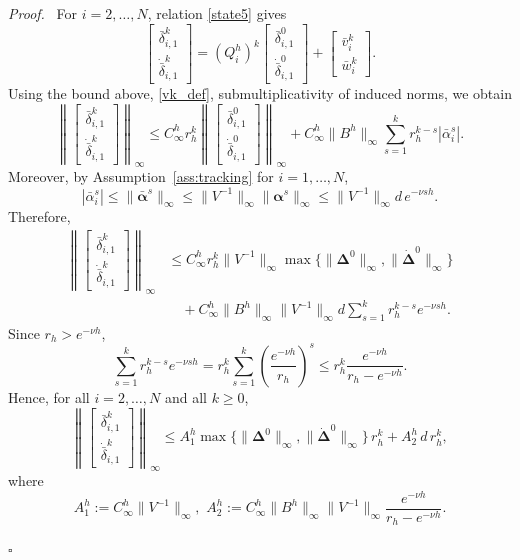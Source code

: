 \documentclass[letterpaper,journal]{IEEEtran}
\newenvironment{proof}{\par\noindent\textit{Proof.}\ }{\hfill$\square$\par}
\begin{document}
\begin{proof}
For \(i=2,\dots,N\), relation \eqref{state5} gives
\[
\begin{bmatrix}
\bar{\delta}_{i,1}^k \\[5pt]
\dot{\bar{\delta}}_{i,1}^k
\end{bmatrix}
=
(Q_i^h)^k
\begin{bmatrix}
\bar{\delta}_{i,1}^{0} \\[5pt]
\dot{\bar{\delta}}_{i,1}^{0}
\end{bmatrix}
+
\begin{bmatrix}
\bar{v}_i^k \\[5pt]
\bar{w}_i^k
\end{bmatrix}.
\]
Using the bound above, \eqref{vk_def}, submultiplicativity of induced norms, we obtain
\[
\left\|
\begin{bmatrix}
\bar{\delta}_{i,1}^k \\[5pt]
\dot{\bar{\delta}}_{i,1}^k
\end{bmatrix}
\right\|_\infty
\le
C_\infty^h r_h^k
\left\|
\begin{bmatrix}
\bar{\delta}_{i,1}^{0} \\[5pt]
\dot{\bar{\delta}}_{i,1}^{0}
\end{bmatrix}
\right\|_\infty
+
C_\infty^h\|B^h\|_\infty
\sum_{s=1}^{k}
r_h^{k-s}|\bar{\alpha}_i^s|.
\]
Moreover, by  Assumption~\ref{ass:tracking} for \(i=1,\dots,N\),
\[
|\bar{\alpha}_i^s|
\le \|\bar{\bm{\alpha}}^s\|_\infty
\le \|V^{-1}\|_\infty \|\bm{\alpha}^s\|_\infty
\le \|V^{-1}\|_\infty d\,e^{-\nu sh}.
\]
Therefore,
\[
\begin{split}
\left\|
\begin{bmatrix}
\bar{\delta}_{i,1}^k \\[5pt]
\dot{\bar{\delta}}_{i,1}^k
\end{bmatrix}
\right\|_\infty
&\le
C_\infty^h r_h^k \|V^{-1}\|_\infty
\max\{\|\bm{\Delta}^0\|_\infty,\|\dot{\bm{\Delta}}^0\|_\infty\}
\\
&\quad+
C_\infty^h\|B^h\|_\infty \|V^{-1}\|_\infty d
\sum_{s=1}^{k}
r_h^{k-s}e^{-\nu sh}.
\end{split}
\]
Since \(r_h>e^{-\nu h}\),
\[
\sum_{s=1}^{k}
r_h^{k-s}e^{-\nu sh}
=
r_h^k\sum_{s=1}^{k}\left(\frac{e^{-\nu h}}{r_h}\right)^s
\le
r_h^k\frac{e^{-\nu h}}{r_h-e^{-\nu h}}.
\]
Hence, for all \(i=2,\dots,N\) and all \(k\ge 0\),
\begin{equation}\label{eq:disagreement_mode_bound}
\left\|
\begin{bmatrix}
\bar{\delta}_{i,1}^k \\[5pt]
\dot{\bar{\delta}}_{i,1}^k
\end{bmatrix}
\right\|_\infty
\le
A_1^h
\max\{\|\bm{\Delta}^0\|_\infty,\|\dot{\bm{\Delta}}^0\|_\infty\}\,r_h^k
+
A_2^h\, d\, r_h^k,
\end{equation}
where
\[
A_1^h:=C_\infty^h\|V^{-1}\|_\infty,
\,\,
A_2^h:=C_\infty^h\|B^h\|_\infty \|V^{-1}\|_\infty
\frac{e^{-\nu h}}{r_h-e^{-\nu h}}.
\]


\end{proof}
\end{document}
